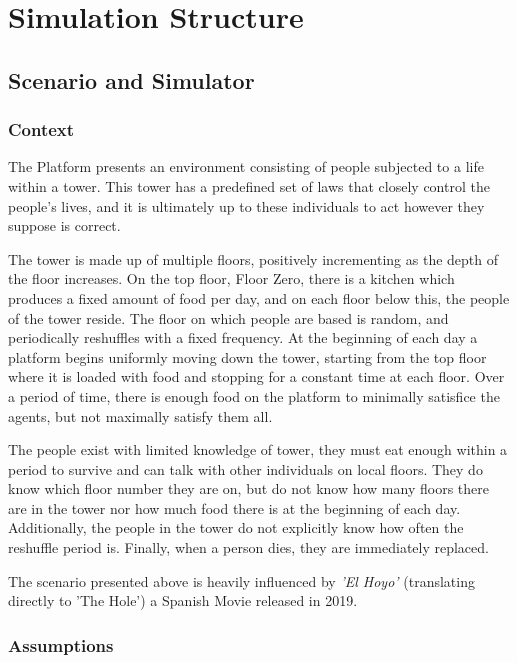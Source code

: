 \chapter{Simulation Structure}\label{simulation_structure}
\section{Scenario and Simulator}\label{scenario_and_simulator}

\subsection{Context}

The Platform presents an environment consisting of people subjected to a life within a tower. This tower has a predefined set of laws that closely control the people’s lives, and it is ultimately up to these individuals to act however they suppose is correct.
 
The tower is made up of multiple floors, positively incrementing as the depth of the floor increases. On the top floor, Floor Zero, there is a kitchen which produces a fixed amount of food per day, and on each floor below this, the people of the tower reside. 
The floor on which people are based is random, and periodically reshuffles with a fixed frequency. At the beginning of each day a platform begins uniformly moving down the tower, starting from the top floor where it is loaded with food and stopping for a constant time at each floor. Over a period of time, there is enough food on the platform to minimally satisfice the agents, but not maximally satisfy them all.
 
The people exist with limited knowledge of tower, they must eat enough within a period to survive and can talk with other individuals on local floors. They do know which floor number they are on, but do not know how many floors there are in the tower nor how much food there is at the beginning of each day. Additionally, the people in the tower do not explicitly know how often the reshuffle period is. Finally, when a person dies, they are immediately replaced.

The scenario presented above is heavily influenced by \textit{'El Hoyo'}\citep{elhoyo2019} (translating directly to 'The Hole') a Spanish Movie released in 2019.

\subsection{Assumptions}


